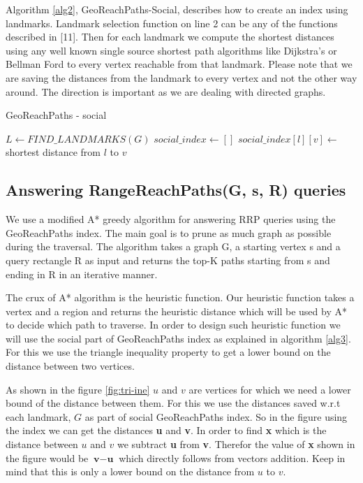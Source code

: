 {Algorithm \ref{alg2}, GeoReachPaths-Social, describes how to create an index using landmarks. Landmark selection function on line 2 can be any of the functions described in [11]. Then for each landmark we compute the shortest distances using any well known single source shortest path algorithms like Dijkstra's or Bellman Ford to every vertex reachable from that landmark. Please note that we are saving the distances from the landmark to every vertex and not the other way around. The direction is important as we are dealing with directed graphs.\\

\begin{algorithm}[t]
\caption{GeoReachPaths - social}
\label{alg2}
\begin{algorithmic}[1]

  \State $L \gets FIND\_LANDMARKS(G)$ 
  \State $social\_index \gets []$
	  	\State $social\_index[l][v] \gets $ shortest distance from $l$ to $v$
	\EndFor
  \EndFor
\EndFunction
\end{algorithmic}
\end{algorithm}

\subsection{Answering RangeReachPaths(G, s, R) queries} \label{querying}

We use a modified A* greedy algorithm for answering RRP queries using the GeoReachPaths index. The main goal is to prune as much graph as possible during the traversal. The algorithm takes a graph G, a starting vertex s and a query rectangle R as input and returns the top-K paths starting from s and ending in R in an iterative manner.

The crux of A* algorithm is the heuristic function. Our heuristic function takes a vertex and a region and returns the heuristic distance which will be used by A* to decide which path to traverse. In order to design such heuristic function we will use the social part of GeoReachPaths index as explained in algorithm \ref{alg3}. For this we use the triangle inequality property to get a lower bound on the distance between two vertices.

As shown in the figure \ref{fig:tri-ine} $u$ and $v$ are vertices for which we need a lower bound of the distance between them. For this we use the distances saved w.r.t each landmark, $G$ as part of social GeoReachPaths index. So in the figure using the index we can get the distances \textbf{u} and \textbf{v}. In order to find \textbf{x} which is the distance between $u$ and $v$ we subtract \textbf{u} from \textbf{v}. Therefor the value of \textbf{x} shown in the figure would be $\textbf{v} - \textbf{u}$ which directly follows from vectors addition. Keep in mind that this is only a lower bound on the distance from $u$ to $v$.

}
